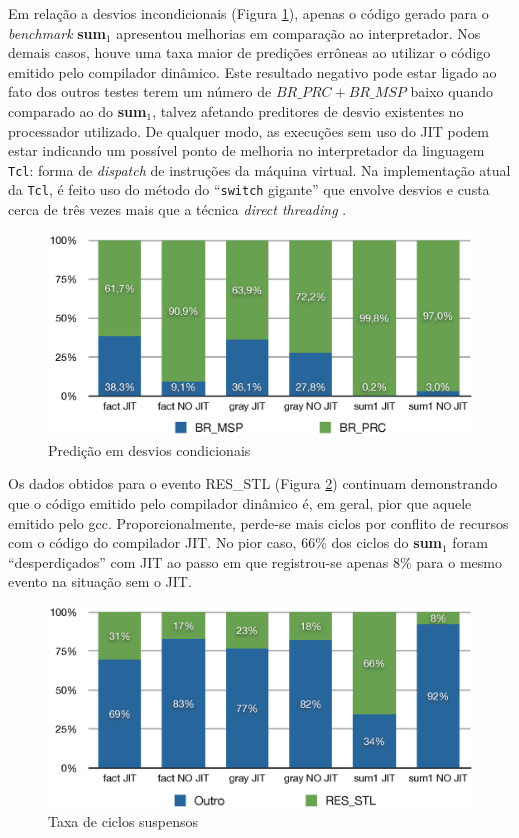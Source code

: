 Em relação a desvios incondicionais (Figura \ref{fig:branch}), apenas o
código gerado para o
\textit{benchmark} \textbf{sum$_1$} apresentou melhorias em comparação ao
interpretador. Nos demais casos, houve uma taxa maior de predições
errôneas ao utilizar o código emitido pelo compilador dinâmico. Este
resultado negativo pode estar ligado ao fato dos outros testes terem
um número de $BR\_PRC + BR\_MSP$ baixo quando comparado ao do
\textbf{sum$_1$}, talvez afetando preditores de desvio existentes no
processador utilizado. De qualquer modo, as execuções sem uso do JIT
podem estar indicando um possível ponto de melhoria no interpretador
da linguagem \texttt{Tcl}: forma de \textit{dispatch} de instruções da
máquina virtual. Na implementação atual da \texttt{Tcl}, é feito uso
do método do ``\verb!switch! gigante'' \cite{vmdispatch} que envolve
desvios e custa cerca
de três vezes mais que a técnica \textit{direct threading}
\cite{vmdispatch}.

\begin{figure}[h!]
  \centering
  \includegraphics[scale=0.70]{figs/branching}
  \caption{Predição em desvios condicionais \label{fig:branch}}
\end{figure}

Os dados obtidos para o evento RES\_STL (Figura \ref{fig:stalled})
continuam demonstrando que o código
emitido pelo compilador dinâmico é, em geral, pior que aquele emitido pelo gcc.
Proporcionalmente, perde-se mais ciclos por conflito de recursos com o
código do compilador JIT. No pior caso, 66\% dos ciclos do
\textbf{sum$_1$} foram ``desperdiçados'' com JIT ao passo em que
registrou-se apenas 8\% para o mesmo evento na situação sem o JIT.

\begin{figure}[ht!]
  \centering
  \includegraphics[scale=0.70]{figs/cyclestall}
  \caption{Taxa de ciclos suspensos\label{fig:stalled}}
\end{figure}

